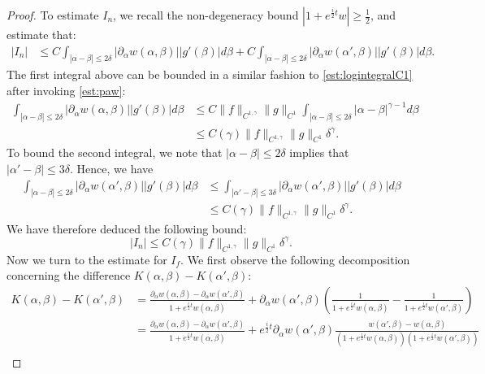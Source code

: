 \documentclass[10pt,a4paper]{amsart}
\newcommand{\p}{\partial}
\newcommand{\palpha}{\p_\alpha}
\begin{document}
\begin{proof}
    To estimate $I_n$, we recall the non-degeneracy bound $|1 + e^{\frac{i}{2}t} w| \ge \frac12$, and estimate that:
    \begin{align*}
        |I_n| &\le C\int_{|\alpha - \beta| \le 2\delta} |\palpha w(\alpha,\beta)||g'(\beta)| d\beta + C\int_{|\alpha - \beta| \le 2\delta} |\palpha w(\alpha',\beta)||g'(\beta)| d\beta.
    \end{align*}
    The first integral above can be bounded in a similar fashion to \eqref{est:logintegralC1} after invoking \eqref{est:paw}:
    \begin{align*}
        \int_{|\alpha - \beta| \le 2\delta} |\palpha w(\alpha,\beta)||g'(\beta)| d\beta &\le C\|f\|_{C^{1,\gamma}}\|g\|_{C^1}\int_{|\alpha - \beta| \le 2\delta} |\alpha - \beta|^{\gamma - 1} d\beta\\
        &\le C(\gamma)\|f\|_{C^{1,\gamma}}\|g\|_{C^1}\delta^\gamma.
    \end{align*}
    To bound the second integral, we note that $|\alpha - \beta| \le 2\delta$ implies that $|\alpha' - \beta| \le 3\delta$. Hence, we have
    \begin{align*}
        \int_{|\alpha - \beta| \le 2\delta} |\palpha w(\alpha',\beta)||g'(\beta)| d\beta &\le \int_{|\alpha' - \beta| \le 3\delta} |\palpha w(\alpha',\beta)||g'(\beta)| d\beta\\
        &\le C(\gamma)\|f\|_{C^{1,\gamma}}\|g\|_{C^1}\delta^\gamma.
    \end{align*}
    We have therefore deduced the following bound:
    \begin{equation}
        \label{est:In}
        |I_n| \le C(\gamma )\|f\|_{C^{1,\gamma}}\|g\|_{C^1}\delta^\gamma.
    \end{equation}
    Now we turn to the estimate for $I_f$. We first observe the following decomposition concerning the difference $K(\alpha,\beta) - K(\alpha',\beta)$:
    \begin{align*}
        K(\alpha,\beta) - K(\alpha',\beta) &= \frac{\palpha w(\alpha,\beta) - \palpha w(\alpha',\beta)}{1+ e^{\frac{i}{2}t} w(\alpha,\beta)} + \palpha w(\alpha',\beta)\left(\frac{1}{1+ e^{\frac{i}{2}t}w(\alpha,\beta)} - \frac{1}{1+ e^{\frac{i}{2}t}w(\alpha',\beta)}\right)\\
        &= \frac{\palpha w(\alpha,\beta) - \palpha w(\alpha',\beta)}{1+ e^{\frac{i}{2}t} w(\alpha,\beta)} + e^{\frac{i}{2}t}\palpha w(\alpha',\beta)\frac{w(\alpha',\beta) - w(\alpha,\beta)}{(1+ e^{\frac{i}{2}t}w(\alpha,\beta))(1+ e^{\frac{i}{2}t}w(\alpha',\beta))}\\

\end{align*}
\end{proof}
\end{document}
